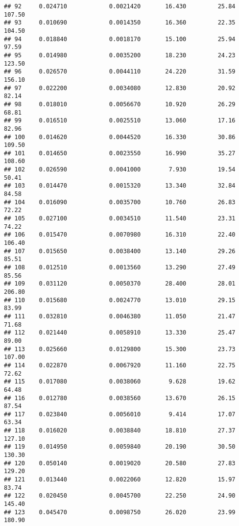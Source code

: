 \documentclass[
]{article}
\begin{document}
\begin{verbatim}
## 92     0.024710            0.0021420       16.430         25.84          107.50
## 93     0.010690            0.0014350       16.360         22.35          104.50
## 94     0.018840            0.0018170       15.100         25.94           97.59
## 95     0.014980            0.0035200       18.230         24.23          123.50
## 96     0.026570            0.0044110       24.220         31.59          156.10
## 97     0.022200            0.0034080       12.830         20.92           82.14
## 98     0.018010            0.0056670       10.920         26.29           68.81
## 99     0.016510            0.0025510       13.060         17.16           82.96
## 100    0.014620            0.0044520       16.330         30.86          109.50
## 101    0.014650            0.0023550       16.990         35.27          108.60
## 102    0.026590            0.0041000        7.930         19.54           50.41
## 103    0.014470            0.0015320       13.340         32.84           84.58
## 104    0.016090            0.0035700       10.760         26.83           72.22
## 105    0.027100            0.0034510       11.540         23.31           74.22
## 106    0.015470            0.0070980       16.310         22.40          106.40
## 107    0.015650            0.0038400       13.140         29.26           85.51
## 108    0.012510            0.0013560       13.290         27.49           85.56
## 109    0.031120            0.0050370       28.400         28.01          206.80
## 110    0.015680            0.0024770       13.010         29.15           83.99
## 111    0.032810            0.0046380       11.050         21.47           71.68
## 112    0.021440            0.0058910       13.330         25.47           89.00
## 113    0.025660            0.0129800       15.300         23.73          107.00
## 114    0.022870            0.0067920       11.160         22.75           72.62
## 115    0.017080            0.0038060        9.628         19.62           64.48
## 116    0.012780            0.0038560       13.670         26.15           87.54
## 117    0.023840            0.0056010        9.414         17.07           63.34
## 118    0.016020            0.0038840       18.810         27.37          127.10
## 119    0.014950            0.0059840       20.190         30.50          130.30
## 120    0.050140            0.0019020       20.580         27.83          129.20
## 121    0.013440            0.0022060       12.820         15.97           83.74
## 122    0.020450            0.0045700       22.250         24.90          145.40
## 123    0.045470            0.0098750       26.020         23.99          180.90

\end{verbatim}
\end{document}
